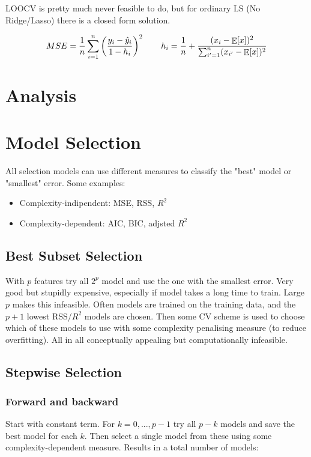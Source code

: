 \documentclass{article}
\DeclareMathOperator*{\E}{\mathbb{E}}
\begin{document}
LOOCV is pretty much never feasible to do, but for ordinary LS (No Ridge/Lasso) there is a closed form solution.

\begin{align*}
    MSE = \frac{1}{n} \sum_{i=1}^{n} \left( \frac{y_i - \hat{y}_i}{1 - h_i} \right)^2 \hspace{20px} h_i = \frac{1}{n} + \frac{(x_i-\E[{x}])^2}{\sum_{i'=1}^{n} (x_{i'}-\E[{x}])^2}
\end{align*}


\section{Analysis}
 

\section{Model Selection}
All selection models can use different measures to classify the "best" model or "smallest" error. Some examples:

\begin{itemize}
    \item Complexity-indipendent: MSE, RSS, $R^2$
    \item Complexity-dependent: AIC, BIC, adjsted $R^2$
\end{itemize}


\subsection{Best Subset Selection}
With $p$ features try all $2^p$ model and use the one with the smallest error. Very good but stupidly expensive, especially if model takes a long time to train. Large $p$ makes this infeasible. Often models are trained on the training data, and the $p+1$ lowest RSS/$R^2$ models are chosen. Then some CV scheme is used to choose which of these models to use with some complexity penalising measure (to reduce overfitting). All in all conceptually appealing but computationally infeasible. 

\subsection{Stepwise Selection}
\subsubsection{Forward and backward}
Start with constant term. For $k = 0, ... , p-1$ try all $p-k$ models and save the best model for each $k$. Then select a single model from these using some complexity-dependent measure. Results in a total number of models:
\end{document}
